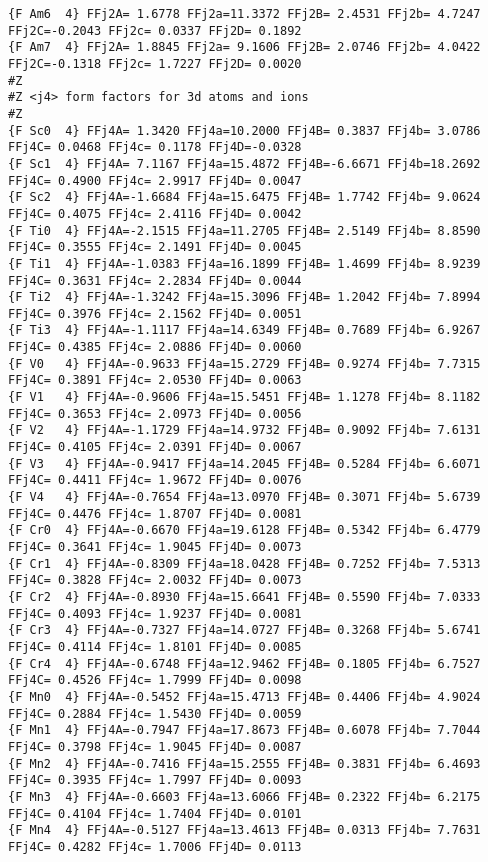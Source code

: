 {\begin{verbatim}
{F Am6  4} FFj2A= 1.6778 FFj2a=11.3372 FFj2B= 2.4531 FFj2b= 4.7247 FFj2C=-0.2043 FFj2c= 0.0337 FFj2D= 0.1892 
{F Am7  4} FFj2A= 1.8845 FFj2a= 9.1606 FFj2B= 2.0746 FFj2b= 4.0422 FFj2C=-0.1318 FFj2c= 1.7227 FFj2D= 0.0020 
#Z
#Z <j4> form factors for 3d atoms and ions
#Z
{F Sc0  4} FFj4A= 1.3420 FFj4a=10.2000 FFj4B= 0.3837 FFj4b= 3.0786 FFj4C= 0.0468 FFj4c= 0.1178 FFj4D=-0.0328 
{F Sc1  4} FFj4A= 7.1167 FFj4a=15.4872 FFj4B=-6.6671 FFj4b=18.2692 FFj4C= 0.4900 FFj4c= 2.9917 FFj4D= 0.0047 
{F Sc2  4} FFj4A=-1.6684 FFj4a=15.6475 FFj4B= 1.7742 FFj4b= 9.0624 FFj4C= 0.4075 FFj4c= 2.4116 FFj4D= 0.0042 
{F Ti0  4} FFj4A=-2.1515 FFj4a=11.2705 FFj4B= 2.5149 FFj4b= 8.8590 FFj4C= 0.3555 FFj4c= 2.1491 FFj4D= 0.0045 
{F Ti1  4} FFj4A=-1.0383 FFj4a=16.1899 FFj4B= 1.4699 FFj4b= 8.9239 FFj4C= 0.3631 FFj4c= 2.2834 FFj4D= 0.0044 
{F Ti2  4} FFj4A=-1.3242 FFj4a=15.3096 FFj4B= 1.2042 FFj4b= 7.8994 FFj4C= 0.3976 FFj4c= 2.1562 FFj4D= 0.0051 
{F Ti3  4} FFj4A=-1.1117 FFj4a=14.6349 FFj4B= 0.7689 FFj4b= 6.9267 FFj4C= 0.4385 FFj4c= 2.0886 FFj4D= 0.0060 
{F V0   4} FFj4A=-0.9633 FFj4a=15.2729 FFj4B= 0.9274 FFj4b= 7.7315 FFj4C= 0.3891 FFj4c= 2.0530 FFj4D= 0.0063 
{F V1   4} FFj4A=-0.9606 FFj4a=15.5451 FFj4B= 1.1278 FFj4b= 8.1182 FFj4C= 0.3653 FFj4c= 2.0973 FFj4D= 0.0056 
{F V2   4} FFj4A=-1.1729 FFj4a=14.9732 FFj4B= 0.9092 FFj4b= 7.6131 FFj4C= 0.4105 FFj4c= 2.0391 FFj4D= 0.0067 
{F V3   4} FFj4A=-0.9417 FFj4a=14.2045 FFj4B= 0.5284 FFj4b= 6.6071 FFj4C= 0.4411 FFj4c= 1.9672 FFj4D= 0.0076 
{F V4   4} FFj4A=-0.7654 FFj4a=13.0970 FFj4B= 0.3071 FFj4b= 5.6739 FFj4C= 0.4476 FFj4c= 1.8707 FFj4D= 0.0081 
{F Cr0  4} FFj4A=-0.6670 FFj4a=19.6128 FFj4B= 0.5342 FFj4b= 6.4779 FFj4C= 0.3641 FFj4c= 1.9045 FFj4D= 0.0073 
{F Cr1  4} FFj4A=-0.8309 FFj4a=18.0428 FFj4B= 0.7252 FFj4b= 7.5313 FFj4C= 0.3828 FFj4c= 2.0032 FFj4D= 0.0073 
{F Cr2  4} FFj4A=-0.8930 FFj4a=15.6641 FFj4B= 0.5590 FFj4b= 7.0333 FFj4C= 0.4093 FFj4c= 1.9237 FFj4D= 0.0081 
{F Cr3  4} FFj4A=-0.7327 FFj4a=14.0727 FFj4B= 0.3268 FFj4b= 5.6741 FFj4C= 0.4114 FFj4c= 1.8101 FFj4D= 0.0085 
{F Cr4  4} FFj4A=-0.6748 FFj4a=12.9462 FFj4B= 0.1805 FFj4b= 6.7527 FFj4C= 0.4526 FFj4c= 1.7999 FFj4D= 0.0098 
{F Mn0  4} FFj4A=-0.5452 FFj4a=15.4713 FFj4B= 0.4406 FFj4b= 4.9024 FFj4C= 0.2884 FFj4c= 1.5430 FFj4D= 0.0059 
{F Mn1  4} FFj4A=-0.7947 FFj4a=17.8673 FFj4B= 0.6078 FFj4b= 7.7044 FFj4C= 0.3798 FFj4c= 1.9045 FFj4D= 0.0087 
{F Mn2  4} FFj4A=-0.7416 FFj4a=15.2555 FFj4B= 0.3831 FFj4b= 6.4693 FFj4C= 0.3935 FFj4c= 1.7997 FFj4D= 0.0093 
{F Mn3  4} FFj4A=-0.6603 FFj4a=13.6066 FFj4B= 0.2322 FFj4b= 6.2175 FFj4C= 0.4104 FFj4c= 1.7404 FFj4D= 0.0101 
{F Mn4  4} FFj4A=-0.5127 FFj4a=13.4613 FFj4B= 0.0313 FFj4b= 7.7631 FFj4C= 0.4282 FFj4c= 1.7006 FFj4D= 0.0113 

\end{verbatim}}
